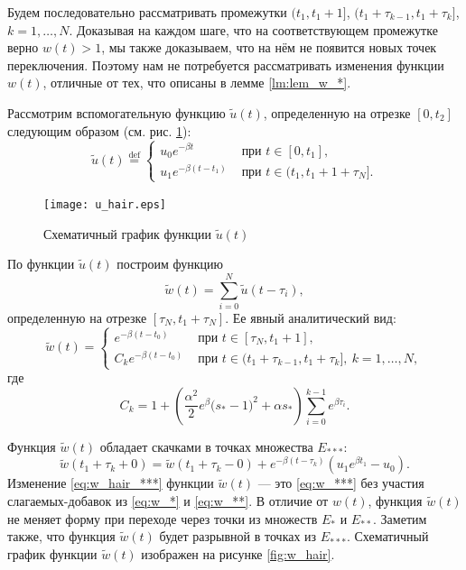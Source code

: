 Будем последовательно рассматривать промежутки $(t_1,t_1+1]$, $(t_1+\tau_{k-1},t_1+\tau_k]$, $k = 1,\ldots,N$. Доказывая на каждом шаге, что на соответствующем промежутке верно $w(t) > 1$, мы также доказываем, что на нём не появится новых точек переключения. Поэтому нам не потребуется рассматривать изменения функции $w(t)$, отличные от тех, что описаны в лемме \ref{lm:lem_w_*}.

Рассмотрим вспомогательную функцию $\tilde{u}(t)$, определенную на отрезке $[0,t_2]$ следующим образом (см. рис. \ref{fig:u_hair}): 
\begin{equation}
	\label{eq:u_hair}
	\tilde{u}(t)\stackrel{\text{def}}{=}\left\lbrace\begin{array}{cl}
		u_0e^{-\beta t} & \text{ при } t\in[0,t_1],
		\\
		u_1e^{-\beta (t-t_1)} & \text{ при } t\in(t_1,t_1+1+\tau_N].
	\end{array}\right.
\end{equation}
%
\begin{figure}
	\centering
	\texttt{[image: u\_hair.eps]}
	\caption{Схематичный график функции $\tilde{u}(t)$}
	\label{fig:u_hair}
\end{figure}
%

По функции $\tilde{u}(t)$ построим функцию
%
\[
\tilde{w}(t) = \sum_{i=0}^{N}\tilde{u}(t-\tau_i),
\]
%
определенную на отрезке $[\tau_N, t_1 + \tau_N]$. Ее явный аналитический вид:
%
\begin{equation}
	\label{eq:w_hair}
	\tilde{w}(t)=
	\begin{cases}
		e^{-\beta (t-t_0)} & \text{ при } t\in[\tau_N,t_1+1],\\
		C_k e^{-\beta(t-t_0)} & \text{ при } t\in(t_1 + \tau_{k-1}, t_1 + \tau_k],\ k=1,\ldots,N,
	\end{cases}
\end{equation}
где
\[C_k = 1+\left(\frac{\alpha^2}{2}e^\beta\big( s_*-1)^2+\alpha s_*\right)\sum_{i=0}^{k-1}e^{\beta \tau_i}.\]

Функция $\tilde{w}(t)$ обладает скачками в точках %
множества $E_{***}$:
\begin{equation}
	\label{eq:w_hair_***} 
	\tilde{w}(t_1 + \tau_k+0) = \tilde{w}(t_1 + \tau_k-0)+
	e^{-\beta(t-\tau_k)}(u_1 e^{\beta t_1}-u_0).
\end{equation}
%
Изменение \eqref{eq:w_hair_***} функции $\tilde{w}(t)$ --- это \eqref{eq:w_***} без участия слагаемых-добавок из \eqref{eq:w_*} и \eqref{eq:w_**}. В отличие от $w(t)$, функция $\tilde{w}(t)$ не меняет форму при переходе через точки из множеств $E_*$ и $E_{**}$. Заметим также, что функция $\tilde{w}(t)$ будет разрывной в точках из $E_{***}$. Схематичный график функции $\tilde{w}(t)$ изображен на рисунке \ref{fig:w_hair}.

